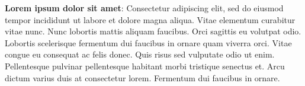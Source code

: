 \textbf{Lorem ipsum dolor sit amet}: Consectetur adipiscing elit, sed do
eiusmod tempor incididunt ut labore et dolore magna aliqua. Vitae
elementum curabitur vitae nunc. Nunc lobortis mattis aliquam faucibus.
Orci sagittis eu volutpat odio. Lobortis scelerisque fermentum dui
faucibus in ornare quam viverra orci. Vitae congue eu consequat ac felis
donec. Quis risus sed vulputate odio ut enim. Pellentesque pulvinar
pellentesque habitant morbi tristique senectus et. Arcu dictum varius
duis at consectetur lorem. Fermentum dui faucibus in ornare.
